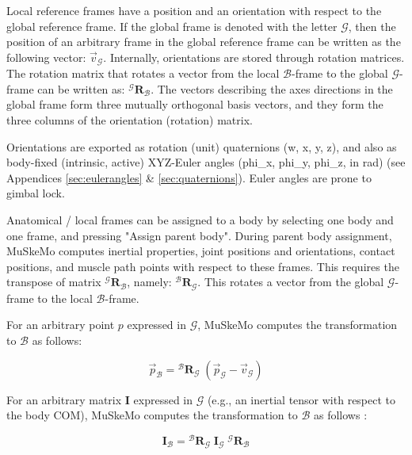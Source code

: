 \documentclass{article}
\begin{document}
Local reference frames have a position and an orientation with respect to the global reference frame. If the global frame is denoted with the letter \(\mathcal{G}\), then the position of an arbitrary frame in the global reference frame can be written as the following vector: \(\vec{v}_{\mathcal{G}}\). Internally, orientations are stored through rotation matrices. The rotation matrix that rotates a vector from the local \(\mathcal{B}\)-frame to the global \(\mathcal{G}\)-frame can be written as: \({}^{\mathcal{G}} \mathbf{R}_{\mathcal{B}}\). The vectors describing the axes directions in the global frame form three mutually orthogonal basis vectors, and they form the three columns of the orientation (rotation) matrix.

Orientations are exported as rotation (unit) quaternions (w, x, y, z), and also as body-fixed (intrinsic, active) XYZ-Euler angles (phi\_x, phi\_y, phi\_z, in rad) (see Appendices \ref{sec:eulerangles} \& \ref{sec:quaternions}). Euler angles are prone to gimbal lock. 

Anatomical / local frames can be assigned to a body by selecting one body and one frame, and pressing "Assign parent body". During parent body assignment, MuSkeMo computes inertial properties, joint positions and orientations, contact positions, and muscle path points with respect to these frames. This requires the transpose of matrix \({}^{\mathcal{G}} \mathbf{R}_{\mathcal{B}}\), namely: \({}^{\mathcal{B}} \mathbf{R}_{\mathcal{G}}\). This rotates a vector from the global \(\mathcal{G}\)-frame to the local \(\mathcal{B}\)-frame.

For an arbitrary point \(p\) expressed in \(\mathcal{G}\), MuSkeMo computes the transformation to \(\mathcal{B}\) as follows: 

\begin{equation}
\vec{p}_{\mathcal{B}} = {}^{\mathcal{B}} \mathbf{R}_{\mathcal{G}} \; (\vec{p}_{\mathcal{G}} - \vec{v}_{\mathcal{G}})
\end{equation}

For an arbitrary matrix \(\mathbf{I}\) expressed in \(\mathcal{G}\) (e.g., an inertial tensor with respect to the body COM), MuSkeMo computes the transformation to \(\mathcal{B}\) as follows \cite{valleryAdvancedDynamics2019}:

\begin{equation}
\mathbf{I}_{\mathcal{B}} = {}^{\mathcal{B}} \mathbf{R}_{\mathcal{G}} \;\mathbf{I}_{\mathcal{G}} \; {}^{\mathcal{G}} \mathbf{R}_{\mathcal{B}}
\label{eq:similaritytransformation}
\end{equation}
\end{document}
